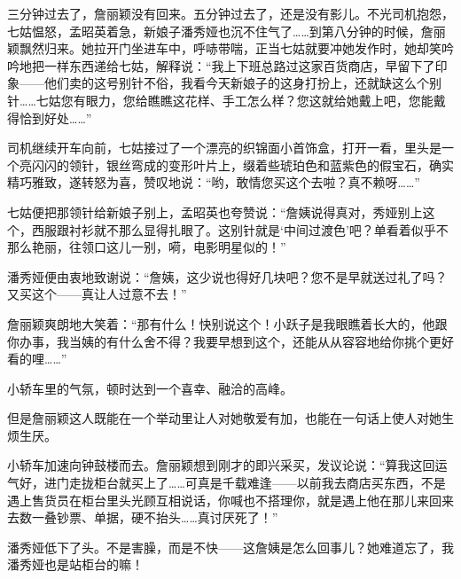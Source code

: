\par 三分钟过去了，詹丽颖没有回来。五分钟过去了，还是没有影儿。不光司机抱怨，七姑愠怒，孟昭英着急，新娘子潘秀娅也沉不住气了……到第八分钟的时候，詹丽颖飘然归来。她拉开门坐进车中，呼哧带喘，正当七姑就要冲她发作时，她却笑吟吟地把一样东西递给七姑，解释说：“我上下班总路过这家百货商店，早留下了印象——他们卖的这号别针不俗，我看今天新娘子的这身打扮上，还就缺这么个别针……七姑您有眼力，您给瞧瞧这花样、手工怎么样？您这就给她戴上吧，您能戴得恰到好处……”
\par 司机继续开车向前，七姑接过了一个漂亮的织锦面小首饰盒，打开一看，里头是一个亮闪闪的领针，银丝弯成的变形叶片上，缀着些琥珀色和蓝紫色的假宝石，确实精巧雅致，遂转怒为喜，赞叹地说：“哟，敢情您买这个去啦？真不赖呀……”
\par 七姑便把那领针给新娘子别上，孟昭英也夸赞说：“詹姨说得真对，秀娅别上这个，西服跟衬衫就不那么显得扎眼了。这别针就是‘中间过渡色’吧？单看着似乎不那么艳丽，往领口这儿一别，嗬，电影明星似的！”
\par 潘秀娅便由衷地致谢说：“詹姨，这少说也得好几块吧？您不是早就送过礼了吗？又买这个——真让人过意不去！”
\par 詹丽颖爽朗地大笑着：“那有什么！快别说这个！小跃子是我眼瞧着长大的，他跟你办事，我当姨的有什么舍不得？我要早想到这个，还能从从容容地给你挑个更好看的哩……”
\par 小轿车里的气氛，顿时达到一个喜幸、融洽的高峰。
\par 但是詹丽颖这人既能在一个举动里让人对她敬爱有加，也能在一句话上使人对她生烦生厌。
\par 小轿车加速向钟鼓楼而去。詹丽颖想到刚才的即兴采买，发议论说：“算我这回运气好，进门走拢柜台就买上了……可真是千载难逢——以前我去商店买东西，不是遇上售货员在柜台里头光顾互相说话，你喊也不搭理你，就是遇上他在那儿来回来去数一叠钞票、单据，硬不抬头……真讨厌死了！”
\par 潘秀娅低下了头。不是害臊，而是不快——这詹姨是怎么回事儿？她难道忘了，我潘秀娅也是站柜台的嘛！
